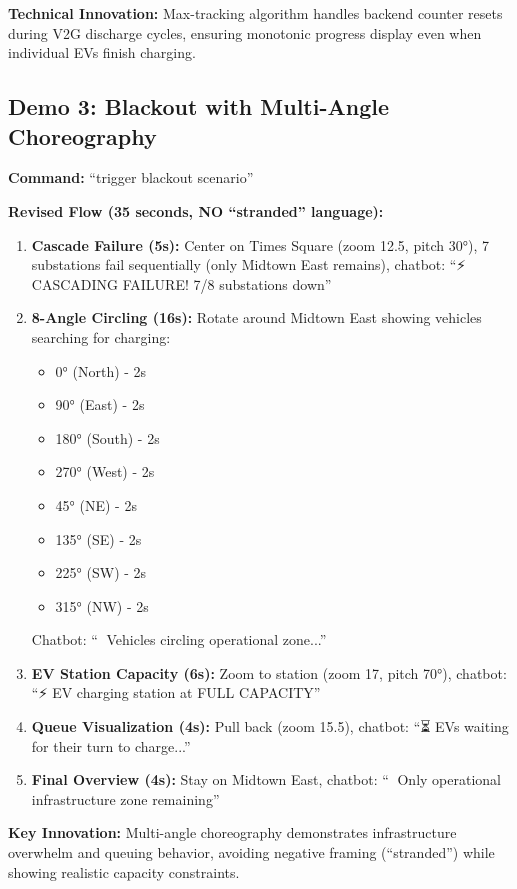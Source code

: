 \documentclass[sigconf]{acmart}
\begin{document}
\textbf{Technical Innovation:} Max-tracking algorithm handles backend counter resets during V2G discharge cycles, ensuring monotonic progress display even when individual EVs finish charging.

\subsection{Demo 3: Blackout with Multi-Angle Choreography}

\textbf{Command:} ``trigger blackout scenario''

\textbf{Revised Flow (35 seconds, NO ``stranded'' language):}
\begin{enumerate}
    \item \textbf{Cascade Failure (5s):} Center on Times Square (zoom 12.5, pitch 30°), 7 substations fail sequentially (only Midtown East remains), chatbot: ``⚡ CASCADING FAILURE! 7/8 substations down''
    \item \textbf{8-Angle Circling (16s):} Rotate around Midtown East showing vehicles searching for charging:
        \begin{itemize}
            \item 0° (North) - 2s
            \item 90° (East) - 2s
            \item 180° (South) - 2s
            \item 270° (West) - 2s
            \item 45° (NE) - 2s
            \item 135° (SE) - 2s
            \item 225° (SW) - 2s
            \item 315° (NW) - 2s
        \end{itemize}
        Chatbot: ``🚗 Vehicles circling operational zone...''
    \item \textbf{EV Station Capacity (6s):} Zoom to station (zoom 17, pitch 70°), chatbot: ``⚡ EV charging station at FULL CAPACITY''
    \item \textbf{Queue Visualization (4s):} Pull back (zoom 15.5), chatbot: ``⏳ EVs waiting for their turn to charge...''
    \item \textbf{Final Overview (4s):} Stay on Midtown East, chatbot: ``📍 Only operational infrastructure zone remaining''
\end{enumerate}

\textbf{Key Innovation:} Multi-angle choreography demonstrates infrastructure overwhelm and queuing behavior, avoiding negative framing (``stranded'') while showing realistic capacity constraints.
\end{document}
